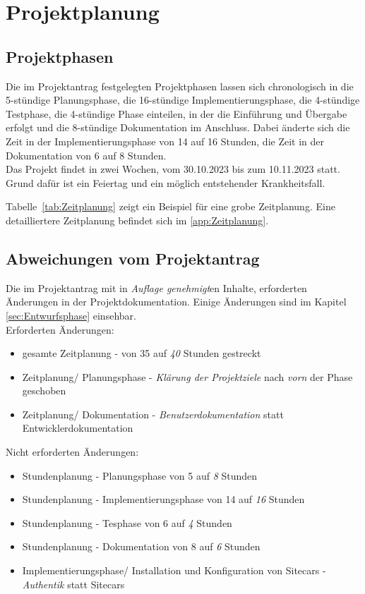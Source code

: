 \section{Projektplanung} 
\label{sec:Projektplanung}


\subsection{Projektphasen}
\label{sec:Projektphasen}
Die im Projektantrag festgelegten Projektphasen lassen sich chronologisch in die 5-stündige Planungsphase, 
die 16-stündige Implementierungsphase, die 4-stündige Testphase, die 4-stündige Phase einteilen, in der die 
Einführung und Übergabe erfolgt und die 8-stündige Dokumentation im Anschluss.
Dabei änderte sich die Zeit in der Implementierungsphase von 14 auf 16 Stunden, die Zeit in der 
Dokumentation von 6 auf 8 Stunden.
\\Das Projekt findet in zwei Wochen, vom 30.10.2023 bis zum 10.11.2023 statt. Grund dafür ist ein Feiertag 
und ein möglich entstehender Krankheitsfall.

Tabelle~\ref{tab:Zeitplanung}  zeigt ein Beispiel für eine grobe Zeitplanung. 
Eine detailliertere Zeitplanung befindet sich im  \ref{app:Zeitplanung}.


\subsection{Abweichungen vom Projektantrag}
\label{sec:AbweichungenProjektantrag}
Die im Projektantrag mit in \textit{Auflage genehmigt}en Inhalte, erforderten Änderungen in der 
Projektdokumentation. Einige Änderungen sind im Kapitel \ref*{sec:Entwurfsphase} 
 einsehbar. 
\\Erforderten Änderungen:
\begin{itemize} [label=--]
	\item gesamte Zeitplanung - von 35 auf \textit{40} Stunden gestreckt
	\item Zeitplanung/ Planungsphase - \textit{Klärung der Projektziele} nach \textit{vorn} der Phase geschoben
	\item Zeitplanung/ Dokumentation - \textit{Benutzerdokumentation} statt Entwicklerdokumentation
\end{itemize}

Nicht erforderten Änderungen:
\begin{itemize} [label=--]
	\item Stundenplanung - Planungsphase von 5 auf \textit{8} Stunden
	\item Stundenplanung - Implementierungsphase von 14 auf \textit{16} Stunden
	\item Stundenplanung - Tesphase von 6 auf \textit{4} Stunden
	\item Stundenplanung - Dokumentation von 8 auf \textit{6} Stunden
	\item Implementierungsphase/ Installation und Konfiguration von Sitecars - \textit{Authentik} statt Sitecars
\end{itemize}


